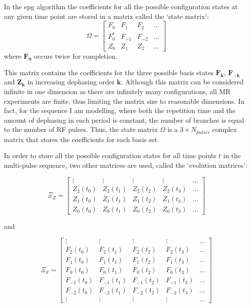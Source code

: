 In the \ac{epg} algorithm the coefficients for all the possible configuration states at any given time point are stored in a matrix called the `state matrix':
\begin{equation}
    \Omega = 
    \begin{bmatrix}
    F_0 & F_1 & F_2 & \dots \\
    F_0^* & F_{-1} & F_{-2} & \dots \\
    Z_0 & Z_1 & Z_2 & \dots 
    \end{bmatrix}
\end{equation}
where $\bm{F_0}$ occurs twice for completion.

\hfill

This matrix contains the coefficients for the three possible basis states $\bm{F_k}$, $\bm{F_{-k}}$ and $\bm{Z_k}$ in increasing dephasing order $\bm{k}$.
Although this matrix can be considered infinite in one dimension as there are infinitely many configurations, all MR experiments are finite, thus limiting the matrix size to reasonable dimensions.
In fact, for the sequence I am modelling, where both the repetition time and the amount of dephasing in each period is constant, the number of branches is equal to the number of RF pulses.
Thus, the state matrix $\Omega$ is a $3 \times N_{pulses}$ complex matrix that stores the coefficients for each basis set.

\hfill

In order to store all the possible configuration states for all time points $t$ in the multi-pulse sequence, two other matrices are used, called the `evolution matrices':

\begin{equation}
    \Xi_Z = 
    \begin{bmatrix}
    \vdots & \vdots & \vdots & \vdots & \dots \\
    Z_2(t_0) & Z_2(t_1) & Z_2(t_2) & Z_2(t_3) & \dots \\
    Z_1(t_0) & Z_1(t_1) & Z_1(t_2) & Z_1(t_3) & \dots \\
    Z_0(t_0) & Z_0(t_1) & Z_0(t_2) & Z_0(t_3) & \dots 
    \end{bmatrix}
\end{equation}

and

\begin{equation}
    \Xi_F = 
    \begin{bmatrix}
    \vdots & \vdots & \vdots & \vdots & \dots \\
    F_2(t_0) & F_2(t_1) & F_2(t_2) & F_2(t_3) & \dots \\
    F_1(t_0) & F_1(t_1) & F_1(t_2) & F_1(t_3) & \dots \\
    F_0(t_0) & F_0(t_1) & F_0(t_2) & F_0(t_3) & \dots \\
    F_{-1}(t_0) & F_{-1}(t_1) & F_{-1}(t_2) & F_{-1}(t_3) & \dots \\
    F_{-2}(t_0) & F_{-2}(t_1) & F_{-2}(t_2) & F_{-2}(t_3) & \dots \\
    \vdots & \vdots & \vdots & \vdots & \dots 
    \end{bmatrix}
\end{equation}

